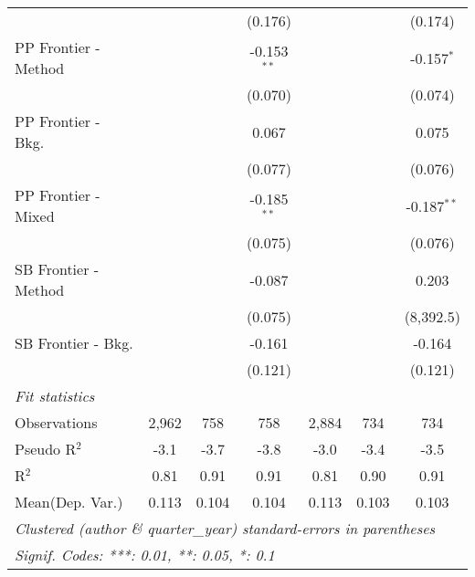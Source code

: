 \begin{tabular}{lcccccc}
                        &               &         & (0.176)       &               &         & (0.174)\\   
   PP Frontier - Method &               &         & -0.153$^{**}$ &               &         & -0.157$^{*}$\\   
                        &               &         & (0.070)       &               &         & (0.074)\\   
   PP Frontier - Bkg.   &               &         & 0.067         &               &         & 0.075\\   
                        &               &         & (0.077)       &               &         & (0.076)\\   
   PP Frontier - Mixed  &               &         & -0.185$^{**}$ &               &         & -0.187$^{**}$\\   
                        &               &         & (0.075)       &               &         & (0.076)\\   
   SB Frontier - Method &               &         & -0.087        &               &         & 0.203\\   
                        &               &         & (0.075)       &               &         & (8,392.5)\\   
   SB Frontier - Bkg.   &               &         & -0.161        &               &         & -0.164\\   
                        &               &         & (0.121)       &               &         & (0.121)\\   
   \midrule
   \emph{Fit statistics}\\
   Observations         & 2,962         & 758     & 758           & 2,884         & 734     & 734\\  
   Pseudo R$^2$         & -3.1          & -3.7    & -3.8          & -3.0          & -3.4    & -3.5\\  
   R$^2$                & 0.81          & 0.91    & 0.91          & 0.81          & 0.90    & 0.91\\  
Mean(Dep. Var.) & 0.113 & 0.104 & 0.104 & 0.113 & 0.103 & 0.103 \\
   \midrule \midrule
   \multicolumn{7}{l}{\emph{Clustered (author \& quarter\_year) standard-errors in parentheses}}\\
   \multicolumn{7}{l}{\emph{Signif. Codes: ***: 0.01, **: 0.05, *: 0.1}}\\
\end{tabular}
\par\endgroup
